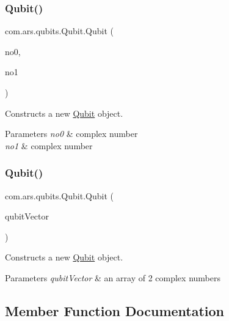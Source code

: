 \subsubsection{\texorpdfstring{Qubit()}{Qubit()}\hspace{0.1cm}{\footnotesize\ttfamily [1/2]}}
{\footnotesize\ttfamily com.\+ars.\+qubits.\+Qubit.\+Qubit (\begin{DoxyParamCaption}\item[{\hyperlink{classcom_1_1ars_1_1complexnumbers_1_1_complex_number}{Complex\+Number}}]{no0,  }\item[{\hyperlink{classcom_1_1ars_1_1complexnumbers_1_1_complex_number}{Complex\+Number}}]{no1 }\end{DoxyParamCaption})}

Constructs a new {\ttfamily \hyperlink{classcom_1_1ars_1_1qubits_1_1_qubit}{Qubit}} object. 
\begin{DoxyParams}{Parameters}
{\em no0} & complex number \\
\hline
{\em no1} & complex number \\
\hline
\end{DoxyParams}
\hypertarget{classcom_1_1ars_1_1qubits_1_1_qubit_a7dfa895c2fc65d9b8eb535e8161c2bb7}{}\label{classcom_1_1ars_1_1qubits_1_1_qubit_a7dfa895c2fc65d9b8eb535e8161c2bb7} 
\subsubsection{\texorpdfstring{Qubit()}{Qubit()}\hspace{0.1cm}{\footnotesize\ttfamily [2/2]}}
{\footnotesize\ttfamily com.\+ars.\+qubits.\+Qubit.\+Qubit (\begin{DoxyParamCaption}\item[{\hyperlink{classcom_1_1ars_1_1complexnumbers_1_1_complex_number}{Complex\+Number} \mbox{[}$\,$\mbox{]}}]{qubit\+Vector }\end{DoxyParamCaption})}

Constructs a new {\ttfamily \hyperlink{classcom_1_1ars_1_1qubits_1_1_qubit}{Qubit}} object. 
\begin{DoxyParams}{Parameters}
{\em qubit\+Vector} & an array of 2 complex numbers \\
\hline
\end{DoxyParams}


\subsection{Member Function Documentation}
\hypertarget{classcom_1_1ars_1_1qubits_1_1_qubit_a2070492aa6a39ee06855fdd94566e4d3}{}\label{classcom_1_1ars_1_1qubits_1_1_qubit_a2070492aa6a39ee06855fdd94566e4d3} 
